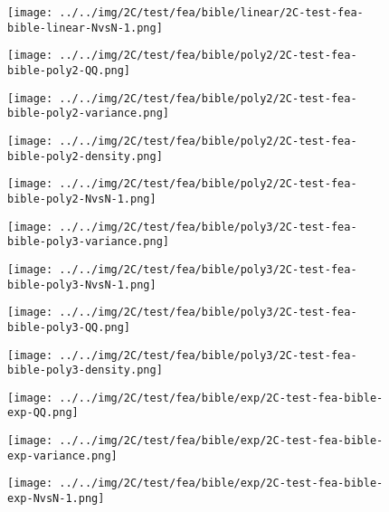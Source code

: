 \begin{figure}[H]
\centering	\texttt{[image: ../../img/2C/test/fea/bible/linear/2C-test-fea-bible-linear-NvsN-1.png]}
\end{figure}
\begin{figure}[H]
\centering	\texttt{[image: ../../img/2C/test/fea/bible/poly2/2C-test-fea-bible-poly2-QQ.png]}
\end{figure}
\begin{figure}[H]
\centering	\texttt{[image: ../../img/2C/test/fea/bible/poly2/2C-test-fea-bible-poly2-variance.png]}
\end{figure}
\begin{figure}[H]
\centering	\texttt{[image: ../../img/2C/test/fea/bible/poly2/2C-test-fea-bible-poly2-density.png]}
\end{figure}
\begin{figure}[H]
\centering	\texttt{[image: ../../img/2C/test/fea/bible/poly2/2C-test-fea-bible-poly2-NvsN-1.png]}
\end{figure}
\begin{figure}[H]
\centering	\texttt{[image: ../../img/2C/test/fea/bible/poly3/2C-test-fea-bible-poly3-variance.png]}
\end{figure}
\begin{figure}[H]
\centering	\texttt{[image: ../../img/2C/test/fea/bible/poly3/2C-test-fea-bible-poly3-NvsN-1.png]}
\end{figure}
\begin{figure}[H]
\centering	\texttt{[image: ../../img/2C/test/fea/bible/poly3/2C-test-fea-bible-poly3-QQ.png]}
\end{figure}
\begin{figure}[H]
\centering	\texttt{[image: ../../img/2C/test/fea/bible/poly3/2C-test-fea-bible-poly3-density.png]}
\end{figure}
\begin{figure}[H]
\centering	\texttt{[image: ../../img/2C/test/fea/bible/exp/2C-test-fea-bible-exp-QQ.png]}
\end{figure}
\begin{figure}[H]
\centering	\texttt{[image: ../../img/2C/test/fea/bible/exp/2C-test-fea-bible-exp-variance.png]}
\end{figure}
\begin{figure}[H]
\centering	\texttt{[image: ../../img/2C/test/fea/bible/exp/2C-test-fea-bible-exp-NvsN-1.png]}
\end{figure}
